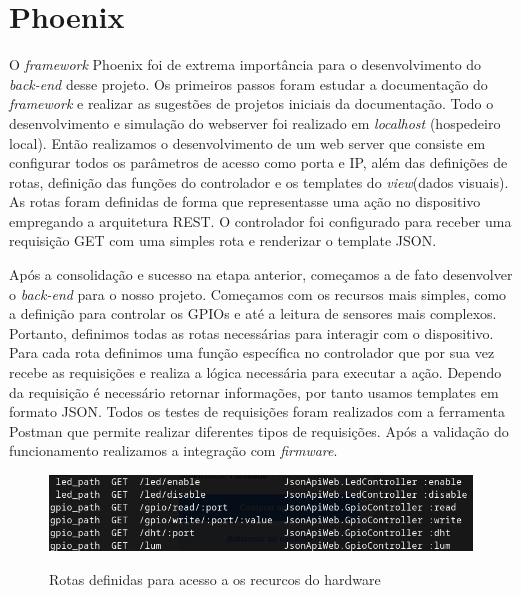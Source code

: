\documentclass[../../layout.tex]{subfiles}
\begin{document}
\section{Phoenix}
O \emph{framework} Phoenix foi de extrema importância para o desenvolvimento do \emph{back-end} desse projeto. Os primeiros passos foram estudar a documentação do \emph{framework} e realizar as sugestões de projetos iniciais da documentação. Todo o desenvolvimento e simulação do webserver foi realizado em \emph{localhost} (hospedeiro local). Então realizamos o desenvolvimento de um web server que consiste em configurar todos os parâmetros de acesso como porta e IP, além das definições de rotas, definição das funções do controlador e os templates do \emph{view}(dados visuais). As rotas foram definidas de forma que representasse uma ação no dispositivo empregando a arquitetura REST. O controlador foi configurado para receber uma requisição GET com uma simples rota e renderizar o template JSON.\par
Após a consolidação e sucesso na etapa anterior, começamos a de fato desenvolver o \emph{back-end} para o nosso projeto. Começamos com os recursos mais simples, como a definição para controlar os GPIOs e até a leitura de sensores mais complexos. Portanto, definimos todas as rotas necessárias para interagir com o dispositivo. Para cada rota definimos uma função específica no controlador que por sua vez recebe as requisições e realiza a lógica necessária para executar a ação. Dependo da requisição é necessário retornar informações, por tanto usamos templates em formato JSON. Todos os testes de requisições foram realizados com a ferramenta Postman que permite realizar diferentes tipos de requisições. Após a validação do funcionamento realizamos a integração com \emph{firmware}.

\begin{figure}[H]
\centering
\caption{Rotas definidas para acesso a os recurcos do hardware}
\includegraphics[width=1\textwidth]{assets/static/img/rotas.jpg}
\label{fig:routes}

\begin{minipage}{0.5\textwidth}
\end{minipage}
\end{figure}
\end{document}
